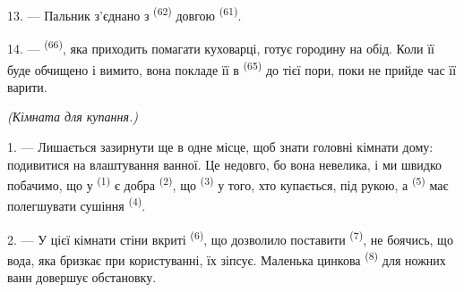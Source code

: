13. --- Пальник з'єднано з  \textsuperscript{(62)} довгою
 \textsuperscript{(61)}.

14. ---  \textsuperscript{(66)}, яка приходить помагати
куховарці, готує городину на обід. Коли її буде обчищено і вимито, вона покладе
її в  \textsuperscript{(65)} до тієї пори, поки не прийде час її
варити.

\VUsaut{4.0mm}
{\centering\fontsize{10.2pt}{10.2pt}\selectfont{} \textit{(Кімната для купання.)}\par}
\VUsaut{3.0mm}

1. --- Лишається зазирнути ще в одне місце, щоб знати головні кімнати дому:
подивитися на влаштування ванної. Це недовго, бо вона невелика, і ми швидко
побачимо, що у  \textsuperscript{(1)} є добра 
\textsuperscript{(2)}, що  \textsuperscript{(3)} у того, хто
купається, під рукою, а  \textsuperscript{(5)} має
полегшувати сушіння  \textsuperscript{(4)}.

2. --- У цієї кімнати стіни вкриті 
\textsuperscript{(6)}, що дозволило поставити  \textsuperscript{(7)},
не боячись, що вода, яка бризкає при користуванні, їх зіпсує. Маленька цинкова
 \textsuperscript{(8)} для ножних ванн довершує обстановку.
\VUsaut{6.0mm}
\VUfilet{22mm}
